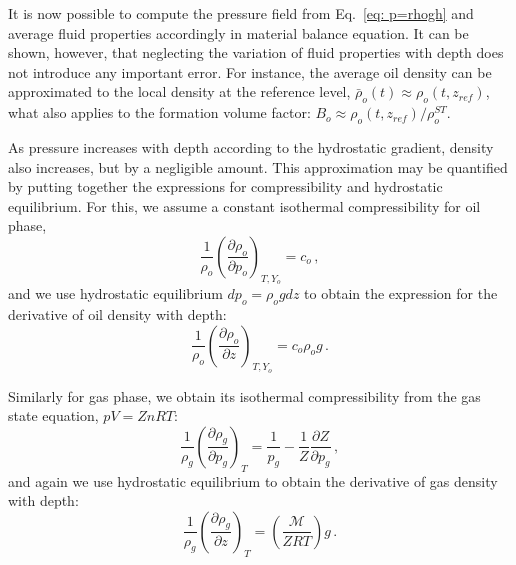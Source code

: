 \documentclass[final,authoryear,5p,times,twocolumn,10pt]{elsarticle}
\begin{document}
It is now possible to compute the pressure field from Eq.~\eqref{eq: p=rhogh} and average fluid properties accordingly in material balance equation. It can be shown, however, that neglecting the variation of fluid properties with depth does not introduce any important error. For instance, the average oil density can be approximated to the local density at the reference level, $\bar{\rho}_o (t) \approx \rho_o (t, z_{ref})$, what also applies to the formation volume factor: $B_o \approx \rho_o (t, z_{ref})/ \rho_o^{ST}$.


%
%
%
%
%
%
%
%
%

As pressure increases with depth according to the hydrostatic gradient, density also increases, but by a negligible amount. This approximation may be quantified by putting together the expressions for compressibility and hydrostatic equilibrium. For this, we assume a constant isothermal compressibility for oil phase,
\begin{equation}\label{eq: grado}
\frac{1}{\rho_o}\left(\frac{\partial \rho_o}{\partial p_o} \right)_{T,Y_o} = c_o \, ,
\end{equation}
 and we use hydrostatic equilibrium $dp_o = \rho_o g dz$ to obtain the expression for the derivative of oil density with depth:
\begin{equation}
 \frac{1}{\rho_o}\left(\frac{\partial \rho_o}{\partial z} \right)_{T,Y_o} = c_o \rho_o g \, .
\end{equation}

Similarly for gas phase, we obtain its isothermal compressibility from the gas state equation, $pV = Zn R T$:
\begin{equation}
\frac{1}{\rho_g}\left(\frac{\partial \rho_g}{\partial p_g}\right)_{T} = \frac{1}{p_g}-\frac{1}{Z}\frac{\partial Z}{\partial p_g} \, ,
\end{equation}
and again we use hydrostatic equilibrium to obtain the derivative of gas density with depth:
\begin{equation}\label{eq: gradg}
\frac{1}{\rho_g}\left(\frac{\partial \rho_g}{\partial z}\right)_{T} = \left(\frac{\mathcal{M}}{ Z R T}\right) g \, .
\end{equation}
\end{document}
